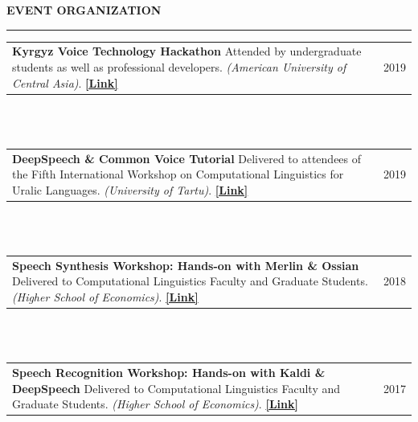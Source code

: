 \documentclass{resume} %
\begin{document}




\begin{minipage}{\textwidth}
\sectionskip
\MakeUppercase{\textbf{Event Organization}}
  \sectionlineskip
  \hrule
\vspace{.5cm}


\begin{tabular}{@{}p{}p{}@{}}
  {\bf Kyrgyz Voice Technology Hackathon} {Attended by undergraduate students as well as professional developers.} {\em (American University of Central Asia)}. {\href{https://jrmeyer.github.io/kyrgyz-voice-hackathon/}{\textbf{[Link]}}}
  &
\hfill   {2019}
\end{tabular}
\\\\

\begin{tabular}{@{}p{}p{}@{}}
  {\bf DeepSpeech \& Common Voice Tutorial} {Delivered to attendees of the Fifth International Workshop on Computational Linguistics for Uralic Languages.} {\em (University of Tartu)}. { \href{https://sisu.ut.ee/iwclul2019/avaleht}{\textbf{[Link]}}}
  &
\hfill {2019}
\end{tabular}
\\\\

\begin{tabular}{@{}p{}p{}@{}}
  {\bf Speech Synthesis Workshop: Hands-on with Merlin \& Ossian} {Delivered to Computational Linguistics Faculty and Graduate Students.} {\em (Higher School of Economics)}. {\href{http://jrmeyer.github.io/tts/2016/12/09/tts-workshop.html}{\textbf{[Link]}}}
  &
\hfill {2018}
\end{tabular}
\\\\

\begin{tabular}{@{}p{}p{}@{}}
  {\bf Speech Recognition Workshop: Hands-on with Kaldi \& DeepSpeech} {Delivered to Computational Linguistics Faculty and Graduate Students.} {\em (Higher School of Economics)}. {\href{http://jrmeyer.github.io/misc/stt-vishka.pdf}{\textbf{[Link]}}}
  &
\hfill {2017}
\end{tabular}
\\\\

\end{minipage}
\end{document}

